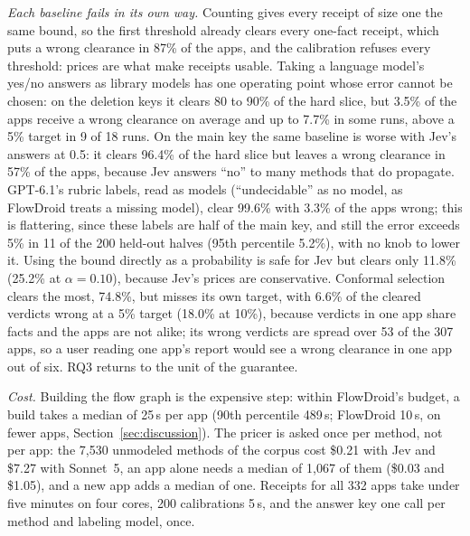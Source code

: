 \emph{Each baseline fails in its own way.}
Counting gives every receipt of size one the same bound, so the first threshold already clears every one-fact receipt, which puts a wrong clearance in 87\% of the apps, and the calibration refuses every threshold: prices are what make receipts usable.
Taking a language model's yes/no answers as library models has one operating point whose error cannot be chosen: on the deletion keys it clears 80 to 90\% of the hard slice, but 3.5\% of the apps receive a wrong clearance on average and up to 7.7\% in some runs, above a 5\% target in 9 of 18 runs.
On the main key the same baseline is worse with Jev's answers at 0.5: it clears 96.4\% of the hard slice but leaves a wrong clearance in 57\% of the apps, because Jev answers ``no'' to many methods that do propagate. GPT-6.1's rubric labels, read as models (``undecidable'' as no model, as FlowDroid treats a missing model), clear 99.6\% with 3.3\% of the apps wrong; this is flattering, since these labels are half of the main key, and still the error exceeds 5\% in 11 of the 200 held-out halves (95th percentile 5.2\%), with no knob to lower it.
Using the bound directly as a probability is safe for Jev but clears only 11.8\% (25.2\% at $\alpha=0.10$), because Jev's prices are conservative.
Conformal selection clears the most, 74.8\%, but misses its own target, with 6.6\% of the cleared verdicts wrong at a 5\% target (18.0\% at 10\%), because verdicts in one app share facts and the apps are not alike; its wrong verdicts are spread over 53 of the 307 apps, so a user reading one app's report would see a wrong clearance in one app out of six.
RQ3 returns to the unit of the guarantee.

\emph{Cost.}
Building the flow graph is the expensive step: within FlowDroid's budget, a build takes a median of 25\,s per app (90th percentile 489\,s; FlowDroid 10\,s, on fewer apps, Section~\ref{sec:discussion}).
The pricer is asked once per method, not per app: the 7{,}530 unmodeled methods of the corpus cost \$0.21 with Jev and \$7.27 with Sonnet~5, an app alone needs a median of 1{,}067 of them (\$0.03 and \$1.05), and a new app adds a median of one.
Receipts for all 332 apps take under five minutes on four cores, 200 calibrations 5\,s, and the answer key one call per method and labeling model, once.


